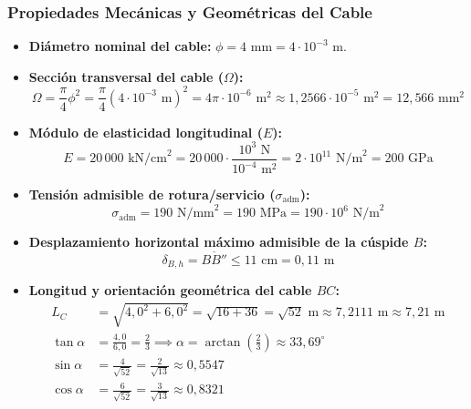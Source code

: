 \subsubsection{Propiedades Mecánicas y Geométricas del Cable}

\begin{itemize}
    \item \textbf{Diámetro nominal del cable:} $\phi = 4\text{ mm} = 4 \cdot 10^{-3}\text{ m}$.
    \item \textbf{Sección transversal del cable ($\Omega$):}
    \begin{equation}
        \Omega = \frac{\pi}{4}\phi^2 = \frac{\pi}{4}(4 \cdot 10^{-3}\text{ m})^2 = 4\pi \cdot 10^{-6}\text{ m}^2 \approx 1{,}2566 \cdot 10^{-5}\text{ m}^2 = 12{,}566\text{ mm}^2
    \end{equation}
    \item \textbf{Módulo de elasticidad longitudinal ($E$):}
    \begin{equation}
        E = 20\,000\text{ kN/cm}^2 = 20\,000 \cdot \frac{10^3\text{ N}}{10^{-4}\text{ m}^2} = 2 \cdot 10^{11}\text{ N/m}^2 = 200\text{ GPa}
    \end{equation}
    \item \textbf{Tensión admisible de rotura/servicio ($\sigma_{\text{adm}}$):}
    \begin{equation}
        \sigma_{\text{adm}} = 190\text{ N/mm}^2 = 190\text{ MPa} = 190 \cdot 10^6\text{ N/m}^2
    \end{equation}
    \item \textbf{Desplazamiento horizontal máximo admisible de la cúspide $B$:}
    \begin{equation}
        \delta_{B,h} = \overline{BB''} \leq 11\text{ cm} = 0{,}11\text{ m}
    \end{equation}
    \item \textbf{Longitud y orientación geométrica del cable $BC$:}
    \begin{align}
        L_C &= \sqrt{4{,}0^2 + 6{,}0^2} = \sqrt{16 + 36} = \sqrt{52}\text{ m} \approx 7{,}2111\text{ m} \approx 7{,}21\text{ m} \\
        \tan \alpha &= \frac{4{,}0}{6{,}0} = \frac{2}{3} \implies \alpha = \arctan\left(\frac{2}{3}\right) \approx 33{,}69^\circ \\
        \sin \alpha &= \frac{4}{\sqrt{52}} = \frac{2}{\sqrt{13}} \approx 0{,}5547 \\
        \cos \alpha &= \frac{6}{\sqrt{52}} = \frac{3}{\sqrt{13}} \approx 0{,}8321
    \end{align}
\end{itemize}

